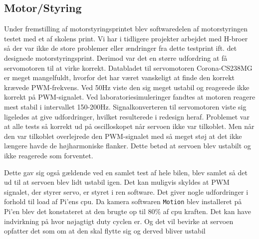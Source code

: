 \subsection{Motor/Styring} \label{sec:hwi_motor_styring}
Under fremstilling af motorstyringsprintet blev softwaredelen af motorstyringen testet med et af skolens print. 
Vi har i tidligere projekter arbejdet med H-broer så der var ikke de store problemer eller ændringer fra dette testprint ift. det designede motorstyringsprint.
Derimod var det en større udfordring at få servomotoren til at virke korrekt.  
Databladet til servomotoren Corona-CS238MG \cite{lib:Corona-CS238MG} er meget mangelfuldt, hvorfor det har været vanskeligt at finde den korrekt krævede PWM-frekvens. 
Ved 50Hz viste den sig meget ustabil og reagerede ikke korrekt på PWM-signalet. 
Ved laboratoriesimuleringer fandtes at motoren reagere mest stabil i intervallet 150-200Hz. 
Signalkonverteren til servomotoren viste sig ligeledes at give udfordringer, hvilket resulterede i redesign heraf.
Problemet var at alle tests så korrekt ud på oscilloskopet når servoen ikke var tilkoblet. 
Men når den var tilkoblet overlejrede den PWM-signalet med så meget støj at det ikke længere havde de højharmoniske flanker. 
Dette betød at servoen blev ustabilt og ikke reagerede som forventet.


Dette gav sig også gældende ved en samlet test af hele bilen, blev samlet så det ud til at servoen blev lidt ustabil igen. 
Det kan muligvis skyldes at PWM signalet, der styrer servo, er styret i ren software. 
Det giver nogle udfordringer i forhold til load af Pi'ens cpu. Da kamera softwaren \texttt{Motion} blev installeret på Pi'en blev det konstateret at den brugte op til 80\% af cpu kraften. Det kan have indvirkning på hvor nøjagtigt duty cyclen er. Og det vil bevirke at servoen opfatter det som om at den skal flytte sig og derved bliver ustabil